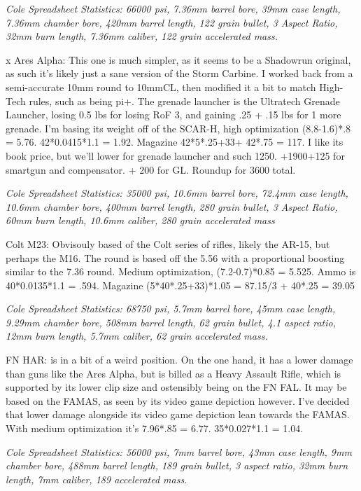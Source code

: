 \begin{multicols*}{2}
	\textit{\textcolor{OliveGreen}{Cole Spreadsheet Statistics: 66000 psi, 7.36mm barrel bore, 39mm case length, 7.36mm chamber bore, 420mm barrel length, 122 grain bullet, 3 Aspect Ratio, 32mm burn length, 7.36mm caliber, 122 grain accelerated mass.}}
	
	x Ares Alpha: This one is much simpler, as it seems to be a Shadowrun original, as such it's likely just a sane version of the Storm Carbine. I worked back from a semi-accurate 10mm round to 10mmCL, then modified it a bit to match High-Tech rules, such as being pi+. The grenade launcher is the Ultratech Grenade Launcher, losing 0.5 lbs for losing RoF 3, and gaining .25 + .15 lbs for 1 more grenade. I'm basing its weight off of the SCAR-H, high optimization (8.8-1.6)*.8 = 5.76. 42*0.0415*1.1 = 1.92. Magazine 42*5*.25+33+ 42*.75 = 117. I like its book price, but we'll lower for grenade launcher and such 1250. +1900+125 for smartgun and compensator. + 200 for GL. Roundup for 3600 total.
	
	\textit{\textcolor{OliveGreen}{Cole Spreadsheet Statistics: 35000 psi, 10.6mm barrel bore, 72.4mm case length, 10.6mm chamber bore, 400mm barrel length, 280 grain bullet, 3 Aspect Ratio, 60mm burn length, 10.6mm caliber, 280 grain accelerated mass}}
	
	Colt M23: Obvisouly based of the Colt series of rifles, likely the AR-15, but perhaps the M16. The round is based off the 5.56 with a proportional boosting similar to the 7.36 round. Medium optimization, (7.2-0.7)*0.85 = 5.525. Ammo is 40*0.0135*1.1 = .594. Magazine (5*40*.25+33)*1.05 = 87.15/3 + 40*.25 = 39.05
	
	\textit{\textcolor{OliveGreen}{Cole Spreadsheet Statistics: 68750 psi, 5.7mm barrel bore, 45mm case length, 9.29mm chamber bore, 508mm barrel length, 62 grain bullet, 4.1 aspect ratio, 12mm burn length, 5.7mm caliber, 62 grain accelerated mass.}}
	
	FN HAR: is in a bit of a weird position. On the one hand, it has a lower damage than guns like the Ares Alpha, but is billed as a Heavy Assault Rifle, which is supported by its lower clip size and ostensibly being on the FN FAL. It may be based on the FAMAS, as seen by its video game depiction however. I've decided that lower damage alongside its video game depiction lean towards the FAMAS. With medium optimization it's 7.96*.85 = 6.77. 35*0.027*1.1 = 1.04.
	
	\textit{\textcolor{OliveGreen}{Cole Spreadsheet Statistics:  56000 psi, 7mm barrel bore, 43mm case length, 9mm chamber bore, 488mm barrel length, 189 grain bullet, 3 aspect ratio, 32mm burn length, 7mm caliber, 189 accelerated mass.}}
	

\end{multicols*}
